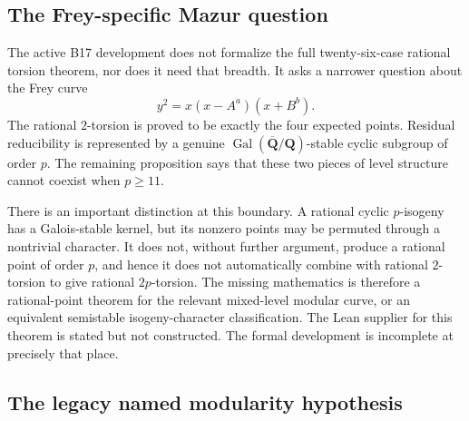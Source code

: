 \documentclass[12pt,reqno]{amsart}
\theoremstyle{plain}
\theoremstyle{definition}
\theoremstyle{remark}
\begin{document}
\subsection{The Frey-specific Mazur question}
\label{def:frey-mazur-question}

The active B17 development does not formalize the full twenty-six-case
rational torsion theorem, nor does it need that breadth.  It asks a narrower
question about the Frey curve
\[
  y^2=x(x-A^a)(x+B^b).
\]
The rational $2$-torsion is proved to be exactly the four expected points.
Residual reducibility is represented by a genuine
$\operatorname{Gal}(\overline{\mathbf Q}/\mathbf Q)$-stable cyclic subgroup of
order $p$.  The remaining proposition says that these two pieces of level
structure cannot coexist when $p\ge 11$.

There is an important distinction at this boundary.  A rational cyclic
$p$-isogeny has a Galois-stable kernel, but its nonzero points may be permuted
through a nontrivial character.  It does not, without further argument,
produce a rational point of order $p$, and hence it does not automatically
combine with rational $2$-torsion to give rational $2p$-torsion.  The missing
mathematics is therefore a rational-point theorem for the relevant
mixed-level modular curve, or an equivalent semistable isogeny-character
classification.  The Lean supplier for this theorem is stated but not
constructed.  The formal development is incomplete at precisely that place.

\subsection{The legacy named modularity hypothesis}
\label{def:modularity-hyp}
\end{document}

